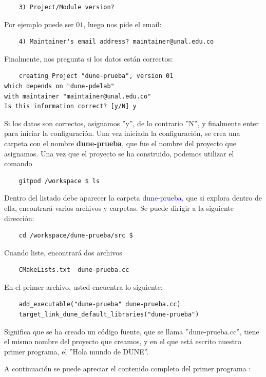\begin{verbatim}
	3) Project/Module version? 
\end{verbatim}
Por ejemplo puede ser $01$, luego nos pide el email:
\begin{verbatim}
	4) Maintainer's email address? maintainer@unal.edu.co 
\end{verbatim}
Finalmente, nos pregunta si los datos están correctos:
\begin{verbatim}
	creating Project "dune-prueba", version 01 
which depends on "dune-pdelab"
with maintainer "maintainer@unal.edu.co"
Is this information correct? [y/N] y
\end{verbatim}
Si los datos son correctos, asignamos ''y'', de lo contrario ''N'', y finalmente enter para iniciar la configuración. Una vez iniciada la configuración,
se crea una carpeta con el nombre \textbf{dune-prueba}, que fue el nombre del proyecto que asignamos.  Una vez que
el proyecto se ha construido, podemos utilizar el comando \begin{verbatim}
	gitpod /workspace $ ls
\end{verbatim}
Dentro del listado debe aparecer la carpeta \textcolor{blue}{dune-prueba}, que si explora dentro de ella, encontrará
varios archivos y carpetas.  Se puede dirigir a la siguiente dirección: {\begin{verbatim}
	cd /workspace/dune-prueba/src $ 
\end{verbatim}}Cuando liste, encontrará dos archivos \begin{verbatim}
	CMakeLists.txt  dune-prueba.cc
\end{verbatim}
En el primer archivo, usted encuentra lo siguiente:
\begin{verbatim}
	add_executable("dune-prueba" dune-prueba.cc)
	target_link_dune_default_libraries("dune-prueba")
\end{verbatim}
Significa que se ha creado un código fuente, que se llama ''dune-prueba.cc'', tiene el mismo nombre del proyecto que
creamos, y en el que está escrito nuestro primer programa, el ''Hola mundo de DUNE''.

A continuación se puede apreciar el contenido completo del primer programa :
\begin{listing}
	\inputminted{cpp}{../../src/dune-learn.cc}
\end{listing}
